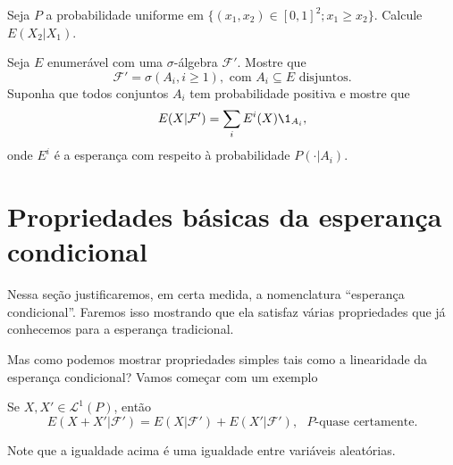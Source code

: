 \begin{exercise}
  Seja $P$ a probabilidade uniforme em $\{(x_1, x_2) \in [0,1]^2; x_1 \geq x_2\}$.
  Calcule $E(X_2|X_1)$.
\end{exercise}

\begin{exercise}
  Seja $E$ enumerável com uma $\sigma$-álgebra $\mathcal{F}'$.
  Mostre que
  \begin{equation}
    \mathcal{F}' = \sigma(A_i, i \geq 1), \text{ com $A_i \subseteq E$ disjuntos}.
  \end{equation}
  Suponha que todos conjuntos $A_i$ tem probabilidade positiva e mostre que
  \begin{equation}
    E(X|\mathcal{F}') = \sum_i E^i(X) \1_{A_i},
  \end{equation}
  onde $E^i$ é a esperança com respeito à probabilidade $P(\cdot|A_i)$.

\end{exercise}


\section{Propriedades básicas da esperança condicional}

Nessa seção justificaremos, em certa medida, a nomenclatura ``esperança condicional''.
Faremos isso mostrando que ela satisfaz várias propriedades que já conhecemos para a esperança tradicional.

Mas como podemos mostrar propriedades simples tais como a linearidade da esperança condicional?
Vamos começar com um exemplo

\begin{proposition}
  Se $X, X' \in \mathcal{L}^1(P)$, então
  \begin{equation}
    E(X + X'|\mathcal{F}') = E(X|\mathcal{F}') + E(X'|\mathcal{F}'), \text{ $P$-quase certamente.}
  \end{equation}
\end{proposition}

Note que a igualdade acima é uma igualdade entre variáveis aleatórias.

